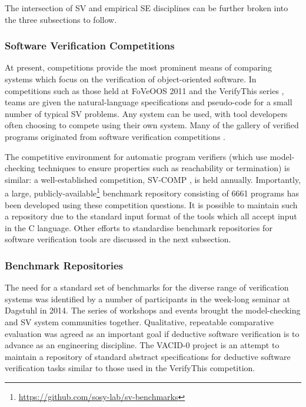 The intersection of SV and empirical SE disciplines can be further broken into the three subsections to follow.      

\subsubsection{Software Verification Competitions}
\label{sub:lrsvmmbench}

At present, competitions provide the most prominent means of comparing systems which focus on the verification of object-oriented software. In competitions such as those held at FoVeOOS 2011 \cite{bormer:hal-00789525} and the VerifyThis series \cite{Huisman2015}, teams are given the natural-language specifications and pseudo-code for a small number of typical SV problems. Any system can be used, with tool developers often choosing to compete using their own system. Many of the \why gallery of verified programs originated from software verification competitions \cite{verifythis, tafat:inria-00636083} . 

The competitive environment for automatic program verifiers (which use model-checking techniques to ensure properties such as reachability or termination) is similar: a well-established competition, SV-COMP \cite{SVCOMP}, is held annually. Importantly, a large, publicly-available\footnote{\url{https://github.com/sosy-lab/sv-benchmarks}} benchmark repository consisting of 6661 programs \cite{Beyer2016} has been developed using these competition questions. It is possible to maintain such a repository due to the standard input format of the tools which all accept input in the C language. Other efforts to standardise benchmark repositories for software verification tools are discussed in the next subsection.  

\subsubsection{Benchmark Repositories}

The need for a standard set of benchmarks for the diverse range of verification systems was identified by a number of participants in the week-long seminar at Dagstuhl \cite{Dagstuhl} in 2014. The series of workshops and events brought the model-checking and SV system communities together. Qualitative, repeatable comparative evaluation was agreed as an important goal if deductive software verification is to advance as an engineering discipline. The VACID-0 \cite{Leino10vacid-0:verification} project is an attempt to maintain a repository of standard abstract specifications for deductive software verification tasks similar to those used in the VerifyThis competition.  

